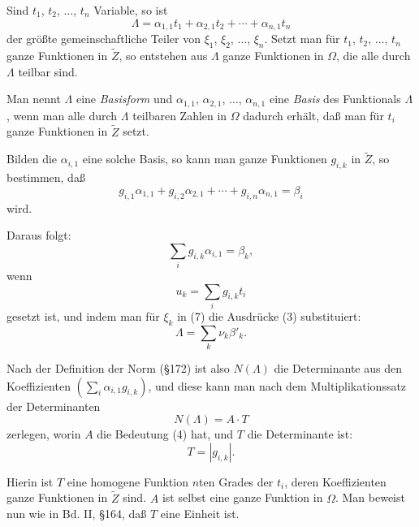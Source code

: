 \documentclass[12pt,a4paper]{article}
\theoremstyle{definition}
\begin{document}
Sind $t_1$, $t_2$, $\ldots$, $t_n$ Variable, so ist
\begin{equation}
\Lambda = \alpha_{1,1}t_1 + \alpha_{2,1}t_2 + \cdots + \alpha_{n,1}t_n
\end{equation}
der größte gemeinschaftliche Teiler von $\xi_1$, $\xi_2$, $\ldots$, $\xi_n$. Setzt man für $t_1$, $t_2$, $\ldots$, $t_n$ ganze Funktionen in $\tilde{Z}$, so entstehen aus $\Lambda$ ganze Funktionen in $\Omega$, die alle durch $\Lambda$ teilbar sind.

Man nennt $\Lambda$ eine \emph{Basisform} und $\alpha_{1,1}$, $\alpha_{2,1}$, $\ldots$, $\alpha_{n,1}$ eine \emph{Basis} des Funktionals $\Lambda$, wenn man alle durch $\Lambda$ teilbaren Zahlen in $\Omega$ dadurch erhält, daß man für $t_i$ ganze Funktionen in $\tilde{Z}$ setzt.

Bilden die $\alpha_{i,1}$ eine solche Basis, so kann man ganze Funktionen $g_{i,k}$ in $\tilde{Z}$, so bestimmen, daß
\begin{equation}
g_{i,1}\alpha_{1,1} + g_{i,2}\alpha_{2,1} + \cdots + g_{i,n}\alpha_{n,1} = \beta_i
\end{equation}
wird.

Daraus folgt:
\begin{equation}
\sum_i g_{i,k}\alpha_{i,1} = \beta_k,
\end{equation}
wenn
\begin{equation}
u_k = \sum_i g_{i,k}t_i\end{equation}
gesetzt ist, und indem man für $\xi_k$ in (7) die Ausdrücke (3) substituiert:
\begin{equation}
\Lambda = \sum_k \nu_k \beta'_k.
\end{equation}

Nach der Definition der Norm (\S 172) ist also $N(\Lambda)$ die Determinante aus den Koeffizienten $(\sum_i \alpha_{i,1}g_{i,k})$, und diese kann man nach dem Multiplikationssatz der Determinanten
\begin{equation}
N(\Lambda) = A \cdot T
\end{equation}
zerlegen, worin $A$ die Bedeutung (4) hat, und $T$ die Determinante ist:
\begin{equation}
T = |g_{i,k}|.
\end{equation}

Hierin ist $T$ eine homogene Funktion $n$ten Grades der $t_i$, deren Koeffizienten ganze Funktionen in $\tilde{Z}$ sind. $A$ ist selbst eine ganze Funktion in $\Omega$. Man beweist nun wie in Bd. II, \S 164, daß $T$ eine Einheit ist.
\end{document}
